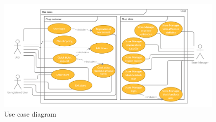 \begin{figure}[H]
	\includegraphics[width=\linewidth]{../Diagrams/CLup Use Cases Diagram.png}
	\caption{Use case diagram}
	\label{fig:UCDiagram}
\end{figure}

